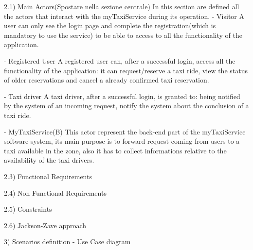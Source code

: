 \documentclass[11pt]{article} %
\begin{document}
  2.1) Main Actors(Spostare nella sezione centrale)
    In this section are defined all the actors that interact with the myTaxiService during its operation.
      - Visitor
          A user can only see the login page and complete the registration(which is mandatory to use the service)
          to be able to access to all the functionality of the application.

      - Registered User
          A registered user can, after a successful login, access all the functionality of the application: it can
          request/reserve a taxi ride, view the status of older reservations and cancel a already confirmed taxi reservation.

      - Taxi driver
          A taxi driver, after a successful login, is granted to: being notified by the system of an incoming request,
          notify the system about the conclusion of a taxi ride.

      - MyTaxiService(B)
          This actor represent the back-end part of the myTaxiService software system, its main purpose is to forward request
          coming from users to a taxi available in the zone, also it has to collect informations relative to the availability
          of the taxi drivers.

    2.3) Functional Requirements

    2.4) Non Functional Requirements

    2.5) Constraints

    2.6) Jackson-Zave approach

3) Scenarios definition - Use Case diagram
\end{document}
